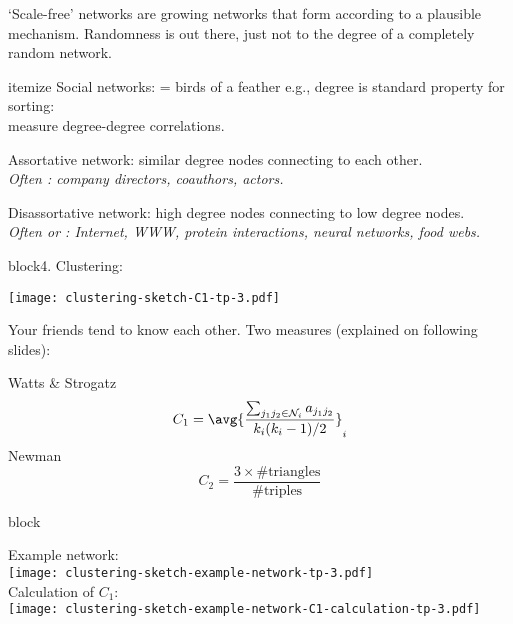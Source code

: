       `Scale-free' networks are \alert{growing networks} that form
      according to a \alert{plausible mechanism}.
     Randomness is out there, just not to the degree of
       a completely random network.
    
  

{itemize}
     Social networks:  = birds of a feather
     e.g., degree is standard property for sorting:\\
      measure degree-degree correlations.
    
      \alert{Assortative} network:\cite{newman2002a} 
      similar degree nodes connecting to each other.\\
      {\textit{Often : company directors, coauthors, actors.}}
    
      \alert{Disassortative} network: high degree nodes connecting to low degree nodes.\\
      {\textit{Often  or : 
        Internet, WWW, protein interactions, neural networks, food webs.}}
    
  

{block}{4. Clustering:}
          
      \texttt{[image: clustering-sketch-C1-tp-3.pdf]}
      
      
       Your friends tend to know each other.
       Two measures (explained on following slides):
        
         Watts \& Strogatz\cite{watts1998a}
          $$ 
          C_1 
          = 
          \avg{
            \frac{\sum_{j_1 j_2 \in {\cal N}_i} a_{j_1 j_2}}
            {k_i(k_i-1)/2}}_{i}
          $$  
         Newman\cite{newman2003a}
          $$ 
          C_2 
          = 
          \frac{3 \times \textrm{\#triangles}}
          {\textrm{\#triples} }
          $$ 
        
      
      

{block}{}
      
    
    Example network:\\
    \texttt{[image: clustering-sketch-example-network-tp-3.pdf]}\\
    Calculation of $C_1$:\\
    \texttt{[image: clustering-sketch-example-network-C1-calculation-tp-3.pdf]}
    
